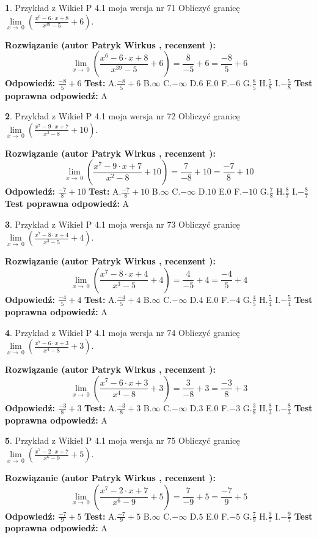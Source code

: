 \documentclass[12pt, a4paper]{article}
\theoremstyle{definition} %
\newtheorem{zad}{}
\newcommand{\zadStart}[1]{\begin{zad}#1\newline}
\newcommand{\zadStop}{\end{zad}}
\newcommand{\rozwStart}[2]{\noindent \textbf{Rozwiązanie (autor #1 , recenzent #2): }\newline}
\newcommand{\rozwStop}{\newline}
\newcommand{\odpStart}{\noindent \textbf{Odpowiedź:}\newline}
\newcommand{\odpStop}{\newline}
\newcommand{\testStart}{\noindent \textbf{Test:}\newline}
\newcommand{\testStop}{\newline}
\newcommand{\kluczStart}{\noindent \textbf{Test poprawna odpowiedź:}\newline}
\newcommand{\kluczStop}{\newline}
\begin{document}
\zadStart{Przykład z Wikieł P 4.1 moja wersja nr 71}
Obliczyć granicę $\lim\limits_{x\to\ 0}(\frac{x^{6}-6 \cdot x +8}{x^{39}-5}+6)$.
\zadStop
\rozwStart{Patryk Wirkus}{}
$$\lim\limits_{x\to\ 0}(\frac{x^{6}-6 \cdot x +8}{x^{39}-5}+6)=\frac{8}{-5}+6=\frac{-8}{5}+6$$
\rozwStop
\odpStart
$\frac{-8}{5}+6$
\odpStop
\testStart
A.$\frac{-8}{5}+6$
B.$\infty$
C.$-\infty$
D.$6$
E.$0$
F.$-6$
G.$\frac{8}{5}$
H.$\frac{5}{8}$
I.$-\frac{5}{8}$
\testStop
\kluczStart
A
\kluczStop



\zadStart{Przykład z Wikieł P 4.1 moja wersja nr 72}
Obliczyć granicę $\lim\limits_{x\to\ 0}(\frac{x^{7}-9 \cdot x +7}{x^{2}-8}+10)$.
\zadStop
\rozwStart{Patryk Wirkus}{}
$$\lim\limits_{x\to\ 0}(\frac{x^{7}-9 \cdot x +7}{x^{2}-8}+10)=\frac{7}{-8}+10=\frac{-7}{8}+10$$
\rozwStop
\odpStart
$\frac{-7}{8}+10$
\odpStop
\testStart
A.$\frac{-7}{8}+10$
B.$\infty$
C.$-\infty$
D.$10$
E.$0$
F.$-10$
G.$\frac{7}{8}$
H.$\frac{8}{7}$
I.$-\frac{8}{7}$
\testStop
\kluczStart
A
\kluczStop



\zadStart{Przykład z Wikieł P 4.1 moja wersja nr 73}
Obliczyć granicę $\lim\limits_{x\to\ 0}(\frac{x^{7}-8 \cdot x +4}{x^{3}-5}+4)$.
\zadStop
\rozwStart{Patryk Wirkus}{}
$$\lim\limits_{x\to\ 0}(\frac{x^{7}-8 \cdot x +4}{x^{3}-5}+4)=\frac{4}{-5}+4=\frac{-4}{5}+4$$
\rozwStop
\odpStart
$\frac{-4}{5}+4$
\odpStop
\testStart
A.$\frac{-4}{5}+4$
B.$\infty$
C.$-\infty$
D.$4$
E.$0$
F.$-4$
G.$\frac{4}{5}$
H.$\frac{5}{4}$
I.$-\frac{5}{4}$
\testStop
\kluczStart
A
\kluczStop



\zadStart{Przykład z Wikieł P 4.1 moja wersja nr 74}
Obliczyć granicę $\lim\limits_{x\to\ 0}(\frac{x^{7}-6 \cdot x +3}{x^{4}-8}+3)$.
\zadStop
\rozwStart{Patryk Wirkus}{}
$$\lim\limits_{x\to\ 0}(\frac{x^{7}-6 \cdot x +3}{x^{4}-8}+3)=\frac{3}{-8}+3=\frac{-3}{8}+3$$
\rozwStop
\odpStart
$\frac{-3}{8}+3$
\odpStop
\testStart
A.$\frac{-3}{8}+3$
B.$\infty$
C.$-\infty$
D.$3$
E.$0$
F.$-3$
G.$\frac{3}{8}$
H.$\frac{8}{3}$
I.$-\frac{8}{3}$
\testStop
\kluczStart
A
\kluczStop



\zadStart{Przykład z Wikieł P 4.1 moja wersja nr 75}
Obliczyć granicę $\lim\limits_{x\to\ 0}(\frac{x^{7}-2 \cdot x +7}{x^{6}-9}+5)$.
\zadStop
\rozwStart{Patryk Wirkus}{}
$$\lim\limits_{x\to\ 0}(\frac{x^{7}-2 \cdot x +7}{x^{6}-9}+5)=\frac{7}{-9}+5=\frac{-7}{9}+5$$
\rozwStop
\odpStart
$\frac{-7}{9}+5$
\odpStop
\testStart
A.$\frac{-7}{9}+5$
B.$\infty$
C.$-\infty$
D.$5$
E.$0$
F.$-5$
G.$\frac{7}{9}$
H.$\frac{9}{7}$
I.$-\frac{9}{7}$
\testStop
\kluczStart
A
\kluczStop
\end{document}
